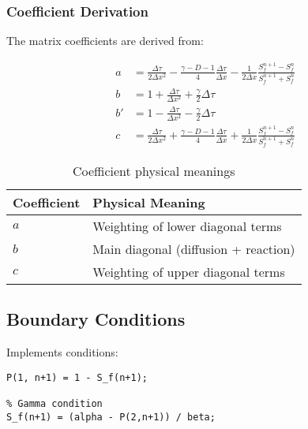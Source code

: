 \documentclass{article}
\begin{document}
\subsubsection{Coefficient Derivation}
The matrix coefficients are derived from:

\begin{align*}
a &= \frac{\Delta\tau}{2\Delta x^2} - \frac{\gamma - D - 1}{4}\frac{\Delta\tau}{\Delta x} - \frac{1}{2\Delta x}\frac{S_f^{n+1} - S_f^n}{S_f^{n+1} + S_f^n} \\
b &= 1 + \frac{\Delta\tau}{\Delta x^2} + \frac{\gamma}{2}\Delta\tau \\
b' &= 1 - \frac{\Delta\tau}{\Delta x^2} - \frac{\gamma}{2}\Delta\tau \\
c &= \frac{\Delta\tau}{2\Delta x^2} + \frac{\gamma - D - 1}{4}\frac{\Delta\tau}{\Delta x} + \frac{1}{2\Delta x}\frac{S_f^{n+1} - S_f^n}{S_f^{n+1} + S_f^n}
\end{align*}

\begin{table}[h]
\centering
\caption{Coefficient physical meanings}
\begin{tabular}{ll}
\hline
Coefficient & Physical Meaning \\ \hline
$a$ & Weighting of lower diagonal terms \\
$b$ & Main diagonal (diffusion + reaction) \\
$c$ & Weighting of upper diagonal terms \\ \hline
\end{tabular}
\end{table}

\subsection{Boundary Conditions}
Implements conditions:
\begin{lstlisting}[caption={Boundary condition implementation}]
% Value-matching condition 
P(1, n+1) = 1 - S_f(n+1);

% Gamma condition 
S_f(n+1) = (alpha - P(2,n+1)) / beta;
\end{lstlisting}
\end{document}
